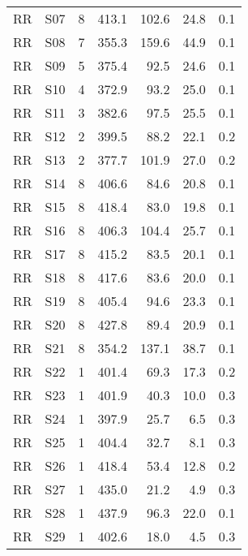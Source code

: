 \begin{table}
\begin{tabular}{rrrrrrr}
   RR &  S07 &             8 &   413.1 & 102.6 &         24.8 &    0.1 \\
   RR &  S08 &             7 &   355.3 & 159.6 &         44.9 &    0.1 \\
   RR &  S09 &             5 &   375.4 &  92.5 &         24.6 &    0.1 \\
   RR &  S10 &             4 &   372.9 &  93.2 &         25.0 &    0.1 \\
   RR &  S11 &             3 &   382.6 &  97.5 &         25.5 &    0.1 \\
   RR &  S12 &             2 &   399.5 &  88.2 &         22.1 &    0.2 \\
   RR &  S13 &             2 &   377.7 & 101.9 &         27.0 &    0.2 \\
   RR &  S14 &             8 &   406.6 &  84.6 &         20.8 &    0.1 \\
   RR &  S15 &             8 &   418.4 &  83.0 &         19.8 &    0.1 \\
   RR &  S16 &             8 &   406.3 & 104.4 &         25.7 &    0.1 \\
   RR &  S17 &             8 &   415.2 &  83.5 &         20.1 &    0.1 \\
   RR &  S18 &             8 &   417.6 &  83.6 &         20.0 &    0.1 \\
   RR &  S19 &             8 &   405.4 &  94.6 &         23.3 &    0.1 \\
   RR &  S20 &             8 &   427.8 &  89.4 &         20.9 &    0.1 \\
   RR &  S21 &             8 &   354.2 & 137.1 &         38.7 &    0.1 \\
   RR &  S22 &             1 &   401.4 &  69.3 &         17.3 &    0.2 \\
   RR &  S23 &             1 &   401.9 &  40.3 &         10.0 &    0.3 \\
   RR &  S24 &             1 &   397.9 &  25.7 &          6.5 &    0.3 \\
   RR &  S25 &             1 &   404.4 &  32.7 &          8.1 &    0.3 \\
   RR &  S26 &             1 &   418.4 &  53.4 &         12.8 &    0.2 \\
   RR &  S27 &             1 &   435.0 &  21.2 &          4.9 &    0.3 \\
   RR &  S28 &             1 &   437.9 &  96.3 &         22.0 &    0.1 \\
   RR &  S29 &             1 &   402.6 &  18.0 &          4.5 &    0.3 \\

\end{tabular}
\end{table}
